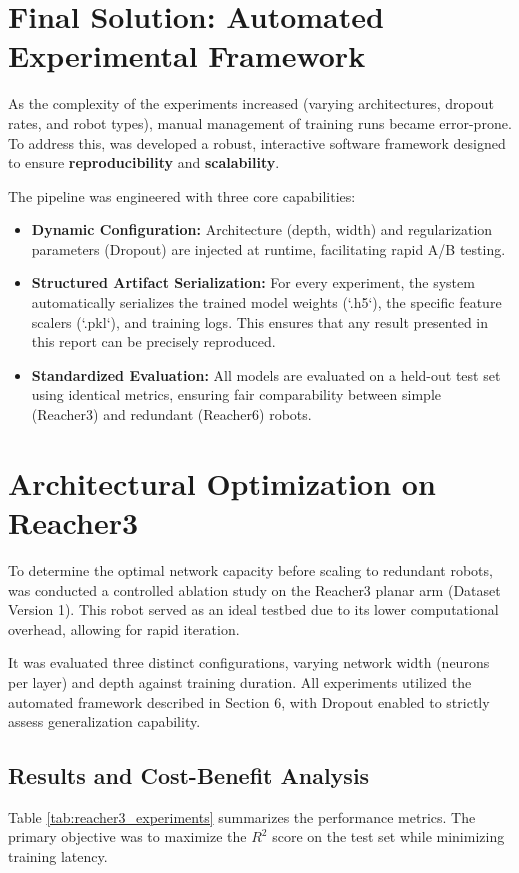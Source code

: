 \documentclass[a4paper,11pt]{article}
\begin{document}
\section{Final Solution: Automated Experimental Framework}
As the complexity of the experiments increased (varying architectures, dropout rates, and robot types), manual management of training runs became error-prone. To address this, was developed a robust, interactive software framework designed to ensure \textbf{reproducibility} and \textbf{scalability}.

The pipeline was engineered with three core capabilities:
\begin{itemize}
    \item \textbf{Dynamic Configuration:} Architecture (depth, width) and regularization parameters (Dropout) are injected at runtime, facilitating rapid A/B testing.
    \item \textbf{Structured Artifact Serialization:} For every experiment, the system automatically serializes the trained model weights (`.h5`), the specific feature scalers (`.pkl`), and training logs. This ensures that any result presented in this report can be precisely reproduced.
    \item \textbf{Standardized Evaluation:} All models are evaluated on a held-out test set using identical metrics, ensuring fair comparability between simple (Reacher3) and redundant (Reacher6) robots.
\end{itemize}

\section{Architectural Optimization on Reacher3}
\label{sec:reacher3_optim}

To determine the optimal network capacity before scaling to redundant robots, was conducted a controlled ablation study on the Reacher3 planar arm (Dataset Version 1). This robot served as an ideal testbed due to its lower computational overhead, allowing for rapid iteration.

It was evaluated three distinct configurations, varying network width (neurons per layer) and depth against training duration. All experiments utilized the automated framework described in Section 6, with Dropout enabled to strictly assess generalization capability.

\subsection{Results and Cost-Benefit Analysis}
Table \ref{tab:reacher3_experiments} summarizes the performance metrics. The primary objective was to maximize the $R^2$ score on the test set while minimizing training latency.
\end{document}
